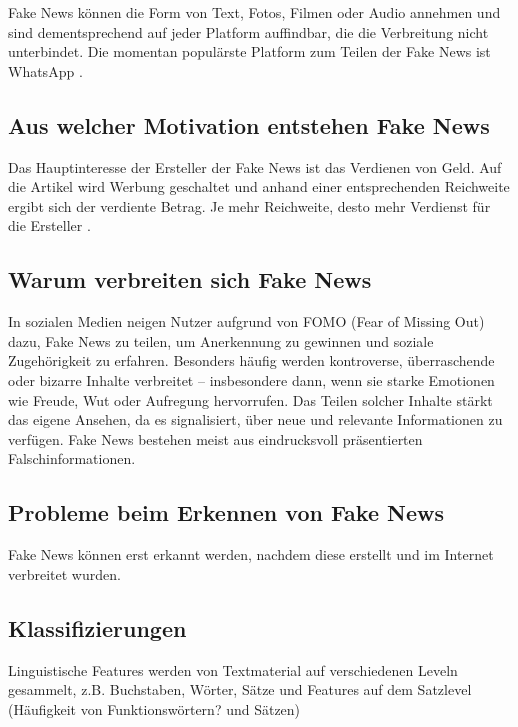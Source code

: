 Fake News können die Form von Text, Fotos, Filmen oder Audio annehmen und sind dementsprechend auf jeder Platform auffindbar, 
die die Verbreitung nicht unterbindet. Die momentan populärste Platform zum Teilen der Fake News ist WhatsApp \cite{Ashish2024}.

\subsection{Aus welcher Motivation entstehen Fake News}

Das Hauptinteresse der Ersteller der Fake News ist das Verdienen von Geld. Auf die Artikel wird Werbung geschaltet und 
anhand einer entsprechenden Reichweite ergibt sich der verdiente Betrag. Je mehr Reichweite, desto mehr Verdienst für die Ersteller \cite{socsci9100185}.

\subsection{Warum verbreiten sich Fake News}

In sozialen Medien neigen Nutzer aufgrund von FOMO (Fear of Missing Out) dazu, Fake News zu teilen, um Anerkennung zu gewinnen und soziale Zugehörigkeit zu erfahren. 
Besonders häufig werden kontroverse, überraschende oder bizarre Inhalte verbreitet – insbesondere dann, wenn sie starke Emotionen wie Freude, Wut oder Aufregung hervorrufen. 
Das Teilen solcher Inhalte stärkt das eigene Ansehen, da es signalisiert, über neue und relevante Informationen zu verfügen. 
Fake News bestehen meist aus eindrucksvoll präsentierten Falschinformationen. \cite{socsci9100185}

\subsection{Probleme beim Erkennen von Fake News}

Fake News können erst erkannt werden, nachdem diese erstellt und im Internet verbreitet wurden. \cite{Sharma:2024}

\subsection{Klassifizierungen}

Linguistische Features werden von Textmaterial auf verschiedenen Leveln gesammelt, z.B. Buchstaben, Wörter, Sätze 
und Features auf dem Satzlevel (Häufigkeit von Funktionswörtern? und Sätzen) \cite{secrypt17}

